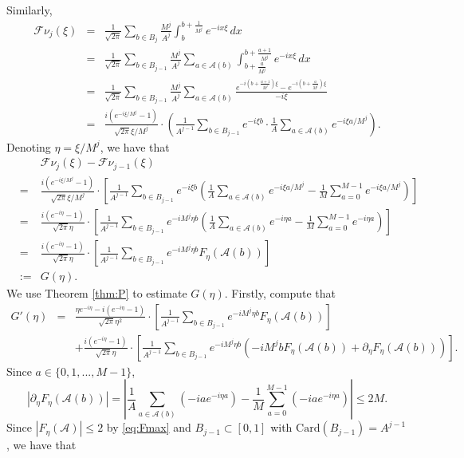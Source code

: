 \documentclass[12pt,reqno]{amsart}
\newcommand\Ac{\mathcal{A}}
\newcommand\Card{\mathrm{Card}}
\newcommand\Fc{\mathcal{F}}
\theoremstyle{plain}
\theoremstyle{remark}
\numberwithin{equation}{section}
\begin{document}
Similarly, 
\begin{eqnarray*}
\Fc\nu_j(\xi)&=&\frac{1}{\sqrt{2\pi}}\sum_{b\in B_j}\frac{M^j}{A^j}\int_b^{b+\frac{1}{M^j}}e^{-ix\xi}\,dx\\
&=&\frac{1}{\sqrt{2\pi}}\sum_{b\in B_{j-1}}\frac{M^j}{A^j}\sum_{a\in\Ac(b)}\int_{b+\frac{a}{M^j}}^{b+\frac{a+1}{M^j}}e^{-ix\xi}\,dx\\
&=&\frac{1}{\sqrt{2\pi}}\sum_{b\in B_{j-1}}\frac{M^j}{A^j}\sum_{a\in\Ac(b)}\frac{e^{-i\left(b+\frac{a+1}{M^j}\right)\xi}-e^{-i\left(b+\frac{a}{M^j}\right)\xi}}{-i\xi}\\
&=&\frac{i\left(e^{-i\xi/M^j}-1\right)}{\sqrt{2\pi}\xi/M^j}\cdot\left(\frac{1}{A^{j-1}}\sum_{b\in B_{j-1}}e^{-i\xi b}\cdot\frac1A\sum_{a\in\Ac(b)}e^{-i\xi a/M^j}\right).
\end{eqnarray*}
Denoting $\eta=\xi/M^j$, we have that
\begin{eqnarray*}
&&\Fc\nu_j(\xi)-\Fc\nu_{j-1}(\xi)\\
&=&\frac{i\left(e^{-i\xi/M^j}-1\right)}{\sqrt{2\pi}\xi/M^j}\cdot\left[\frac{1}{A^{j-1}}\sum_{b\in B_{j-1}}e^{-i\xi b}\left(\frac1A\sum_{a\in\Ac(b)}e^{-i\xi a/M^j}-\frac1M\sum_{a=0}^{M-1}e^{-i\xi a/M^j}\right)\right]\\
&=&\frac{i\left(e^{-i\eta}-1\right)}{\sqrt{2\pi}\eta}\cdot\left[\frac{1}{A^{j-1}}\sum_{b\in B_{j-1}}e^{-iM^j\eta b}\left(\frac1A\sum_{a\in\Ac(b)}e^{-i\eta a}-\frac1M\sum_{a=0}^{M-1}e^{-i\eta a}\right)\right]\\
&=&\frac{i\left(e^{-i\eta}-1\right)}{\sqrt{2\pi}\eta}\cdot\left[\frac{1}{A^{j-1}}\sum_{b\in B_{j-1}}e^{-iM^j\eta b}F_\eta\left(\Ac(b)\right)\right]\\
&:=&G(\eta).
\end{eqnarray*}
We use Theorem \ref{thm:P} to estimate $G(\eta)$. Firstly, compute that
\begin{eqnarray*}
G'(\eta)&=&\frac{\eta e^{-i\eta}-i\left(e^{-i\eta}-1\right)}{\sqrt{2\pi}\eta^2}\cdot\left[\frac{1}{A^{j-1}}\sum_{b\in B_{j-1}}e^{-iM^j\eta b}F_\eta\left(\Ac(b)\right)\right]\\
&&+\frac{i\left(e^{-i\eta}-1\right)}{\sqrt{2\pi}\eta}\cdot\left[\frac{1}{A^{j-1}}\sum_{b\in B_{j-1}}e^{-iM^j\eta b}\left(-iM^jbF_\eta\left(\Ac(b)\right)+\partial_\eta F_\eta\left(\Ac(b)\right)\right)\right].
\end{eqnarray*}
Since $a\in\{0,1,...,M-1\}$,
$$\left|\partial_\eta F_\eta\left(\Ac(b)\right)\right|=\left|\frac1A\sum_{a\in\Ac(b)}\left(-iae^{-i\eta a}\right)-\frac1M\sum_{a=0}^{M-1}\left(-iae^{-i\eta a}\right)\right|\le2M.$$
Since $|F_\eta(\Ac)|\le2$ by \eqref{eq:Fmax} and $B_{j-1}\subset[0,1]$ with $\Card(B_{j-1})=A^{j-1}$, we have that
\end{document}
